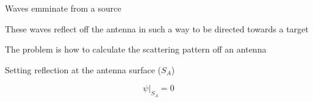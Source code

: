 Waves emminate from a source

These waves reflect off the antenna in such a way to be directed towards a target

The problem is how to calculate the scattering pattern off an antenna

Setting reflection at the antenna surface ($S_A$)

$$\left.\psi \right|_{S_A} = 0$$

\begin{center}
\end{center}
